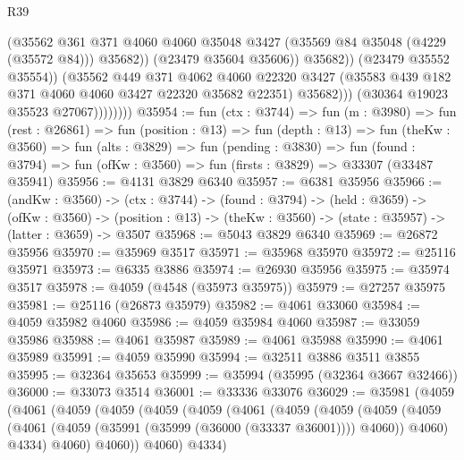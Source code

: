 \begin{lexlean}{R39}
\begin{coremodule}
                                (@35562
                                  @361
                                  @371
                                  @4060
                                  @4060
                                  @35048
                                  @3427
                                  (@35569 @84 @35048 (@4229 (@35572 @84)))
                                  @35682))
                              (@23479 @35604 @35606))
                            @35682))
                        (@23479 @35552 @35554))
                      (@35562
                        @449
                        @371
                        @4062
                        @4060
                        @22320
                        @3427
                        (@35583 @439 @182 @371 @4060 @4060 @3427 @22320 @35682 @22351)
                        @35682)))
                  (@30364 @19023 @35523 @27067))))))))
@35954 := fun (ctx : @3744) =>
  fun (m : @3980) =>
  fun (rest : @26861) =>
  fun (position : @13) =>
  fun (depth : @13) =>
  fun (theKw : @3560) =>
  fun (alts : @3829) =>
  fun (pending : @3830) =>
  fun (found : @3794) => fun (ofKw : @3560) => fun (firsts : @3829) => @33307 (@33487 @35941)
@35956 := @4131 @3829 @6340
@35957 := @6381 @35956
@35966 := (andKw : @3560) ->
  (ctx : @3744) ->
  (found : @3794) ->
  (held : @3659) ->
  (ofKw : @3560) ->
  (position : @13) -> (theKw : @3560) -> (state : @35957) -> (latter : @3659) -> @3507
@35968 := @5043 @3829 @6340
@35969 := @26872 @35956
@35970 := @35969 @3517
@35971 := @35968 @35970
@35972 := @25116 @35971
@35973 := @6335 @3886
@35974 := @26930 @35956
@35975 := @35974 @3517
@35978 := @4059 (@4548 (@35973 @35975))
@35979 := @27257 @35975
@35981 := @25116 (@26873 @35979)
@35982 := @4061 @33060
@35984 := @4059 @35982 @4060
@35986 := @4059 @35984 @4060
@35987 := @33059 @35986
@35988 := @4061 @35987
@35989 := @4061 @35988
@35990 := @4061 @35989
@35991 := @4059 @35990
@35994 := @32511 @3886 @3511 @3855
@35995 := @32364 @35653
@35999 := @35994 (@35995 (@32364 @3667 @32466))
@36000 := @33073 @3514
@36001 := @33336 @33076
@36029 := @35981
    (@4059
      (@4061
        (@4059
          (@4059
            (@4059
              (@4059
                (@4061
                  (@4059
                    (@4059
                      (@4059
                        (@4059
                          (@4061 (@4059 (@35991 (@35999 (@36000 (@33337 @36001)))) @4060))
                          @4060)
                        @4334)
                      @4060)
                    @4060))
                @4060)
              @4334)

\end{coremodule}
\end{lexlean}
